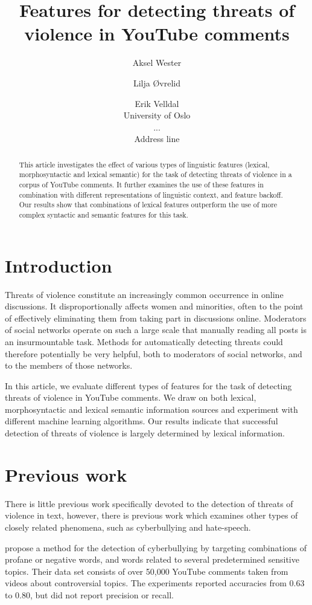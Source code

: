 \documentclass[11pt,letterpaper]{article}
\title{Features for detecting threats of violence in YouTube comments}
\author{Aksel Wester \and Lilja Øvrelid \and Erik Velldal \\
        University of Oslo \\ ... \\ Address line}
\date{}
\begin{document}
\maketitle

\begin{abstract}
This article investigates the effect of various types of linguistic features (lexical, morphosyntactic and lexical semantic) for the task of detecting threats of violence in a corpus of YouTube comments. It further examines the use of these features in combination with different representations of linguistic context, and feature backoff. Our results show that combinations of lexical features outperform the use of more complex syntactic and semantic features for this task.
\end{abstract}

\section{Introduction}
\label{sec:intro}
Threats of violence constitute an increasingly common occurrence in online discussions. It disproportionally affects women and minorities, often to the point of effectively eliminating them from taking part in discussions online. Moderators of social networks operate on such a large scale that manually reading all posts is an insurmountable task. Methods for automatically detecting threats could therefore potentially be very helpful, both to moderators of social networks, and to the members of those networks.

In this article, we evaluate different types of features for the task of detecting threats of violence in YouTube comments. We draw on both lexical, morphosyntactic and lexical semantic information sources and experiment with different machine learning algorithms. Our results indicate that successful detection of threats of violence is largely determined by lexical information.

\section{Previous work}
\label{sec:prev}
There is little previous work specifically devoted to the detection of threats of violence in text, however, there is previous work which examines other types of closely related phenomena, such as cyberbullying and hate-speech.

 propose a method for the detection of cyberbullying by targeting combinations of profane or negative words, and words related to several predetermined sensitive topics. Their data set consists of over 50,000 YouTube comments taken from videos about controversial topics. %
The experiments reported accuracies from 0.63 to 0.80, but did not report precision or recall.
\end{document}

